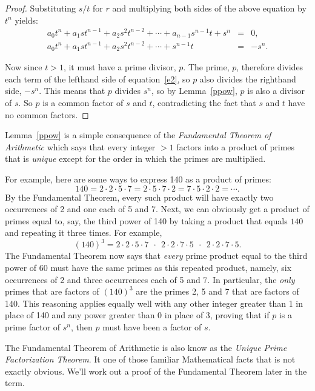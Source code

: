 \documentclass[handout]{mcs}
\begin{document}
\begin{problem}
\begin{solution}
\begin{proof}
Substituting $s/t$ for $r$ and multiplying both sides of the above
equation by $t^n$ yields:
\begin{eqnarray}
a_0t^n+a_1st^{n-1}+a_2s^2t^{n-2}+ \cdots + a_{n-1}s^{n-1}t+s^n & = & 0,\\
a_0t^n+a_1st^{n-1}+a_2s^2t^{n-2}+ \cdots + s^{n-1}t & = & -s^n.\label{e2}
\end{eqnarray}

Now since $t>1$, it must have a prime divisor, $p$.  The prime, $p$,
therefore divides each term of the lefthand side of equation~\eqref{e2},
so $p$ also divides the righthand side, $-s^n$.  This means that $p$
divides $s^n$, so by Lemma~\ref{ppow}, $p$ is also a divisor of
$s$.  So $p$ is a common factor of $s$ and $t$, contradicting the
fact that $s$ and $t$ have no common factors.
\end{proof}

Lemma~\ref{ppow} is a simple consequence of the \emph{Fundamental Theorem
  of Arithmetic} which says that every integer $> 1$ factors into a
product of primes that is \emph{unique} except for the order in which the
primes are multiplied.

For example, here are some ways to express 140 as a product of primes:
\[
140 = 2\cdot 2 \cdot 5 \cdot 7 = 2\cdot 5 \cdot 7 \cdot 2 = 7 \cdot 5 \cdot
2\cdot 2 = \cdots.
\]
By the Fundamental Theorem, every such product will have exactly two
occurrences of 2 and one each of 5 and 7.  Next, we can obviously get a
product of primes equal to, say, the third power of 140 by taking a
product that equals $140$ and repeating it three times.  For example,
\[
(140)^3 = 2\cdot 2 \cdot 5 \cdot 7 \ \ \cdot \ \  2\cdot 2 \cdot 7 \cdot 5
\ \ \cdot \ \ 2\cdot 2 \cdot 7 \cdot 5.
\]
The Fundamental Theorem now says that \emph{every} prime product equal to
the third power of 60 must have the same primes as this repeated product,
namely, six occurrences of 2 and three occurrences each of 5 and 7.  In
particular, the \emph{only} primes that are factors of $(140)^3$ are the
primes 2, 5 and 7 that are factors of 140.  This reasoning applies equally
well with any other integer greater than 1 in place of 140 and any power
greater than 0 in place of 3, proving that if $p$ is a prime factor of
$s^n$, then $p$ must have been a factor of $s$.

The Fundamental Theorem of Arithmetic is also know as the \emph{Unique
  Prime Factorization Theorem}.  It one of those familiar Mathematical
facts that is not exactly obvious.  We'll work out a proof of the
Fundamental Theorem later in the term.
\end{solution}

\eparts

\end{problem}
\end{document}
